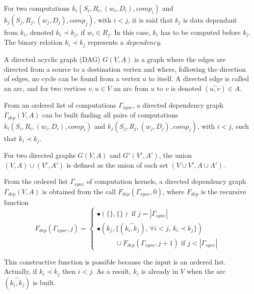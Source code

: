 \begin{mydef}
For two computations $k_i(S_i,R_i,(w_i,D_i),comp_i)$ and $k_j(S_j,R_j,(w_j,D_j),comp_j)$, with $i < j$, it is said that $k_j$ is data dependant from $k_i$, denoted $k_i\prec k_j$, if $w_i \in R_j$. In this case, $k_i$ has to be computed before $k_j$. The binary relation $k_i\prec k_j$ represents a \textit{dependency}.
\end{mydef}

\begin{mydef}
A directed acyclic graph (DAG) $G(V,A)$ is a graph where the edges are directed from a source to a destination vertex and where, following the direction of edges, no cycle can be found from a vertex $u$ to itself. A directed edge is called an arc, and for two vertices $v,u \in V$ an arc from $u$ to $v$ is denoted $(\overset{\frown}{u,v}) \in A$.
\end{mydef}

From an ordered list of computations $\Gamma_{sync}$, a directed dependency graph $\Gamma_{dep}(V,A)$ can be built finding all pairs of computations $k_i(S_i,R_i,(w_i,D_i),comp_i)$ and $k_j(S_j,R_j,(w_j,D_j),comp_j)$, with $i<j$, such that $k_i \prec k_j$. 

\begin{mydef}
For two directed graphs $G(V,A)$ and $G'(V',A')$, the union $(V,A)\cup (V',A')$ is defined as the union of each set $(V\cup V', A \cup A')$.
\end{mydef}

\begin{mydef}
From the ordered list $\Gamma_{sync}$ of computation kernels, a directed dependency graph $\Gamma_{dep}(V,A)$ is obtained from the call $F_{dep}(\Gamma_{sync},0)$, where $F_{dep}$ is the recursive function
\begin{equation*}
F_{dep}(\Gamma_{sync},j) = 
\begin{cases} 	\bullet (\{\},\{\}) \mbox{ if }j=|\Gamma_{sync}|\\
				\bullet (k_j, \{(\overset{\frown}{k_i,k_j})\mbox{, }\forall i < j \mbox{, } k_i\prec k_j \})\\
				\text{ } \qquad \cup F_{dep}(\Gamma_{sync},j+1) \mbox{ if }j<|\Gamma_{sync}|
\end{cases}
\end{equation*}
\end{mydef}

This constructive function is possible because the input is an ordered list. Actually, if $k_i\prec k_j$ then $i<j$. As a result, $k_i$ is already in $V$ when the arc $(\overset{\frown}{k_i,k_j})$ is built. 

